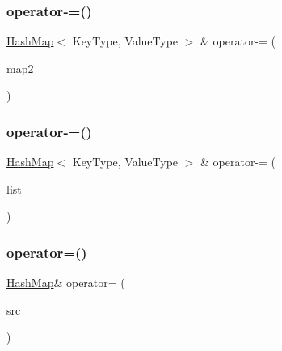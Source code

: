 \mbox{\label{classHashMap_aa83ed71e72154b05ef8383a1edf82a92}} 
\subsubsection{\texorpdfstring{operator-\/=()}{operator-=()}\hspace{0.1cm}{\footnotesize\ttfamily [1/2]}}
{\footnotesize\ttfamily \mbox{\hyperlink{classHashMap}{Hash\+Map}}$<$ Key\+Type, Value\+Type $>$ \& operator-\/= (\begin{DoxyParamCaption}\item[{const \mbox{\hyperlink{classHashMap}{Hash\+Map}}$<$ Key\+Type, Value\+Type $>$ \&}]{map2 }\end{DoxyParamCaption})}

\mbox{\label{classHashMap_ab0fc9969c9d5ebeada5561b18fa2b3eb}} 
\subsubsection{\texorpdfstring{operator-\/=()}{operator-=()}\hspace{0.1cm}{\footnotesize\ttfamily [2/2]}}
{\footnotesize\ttfamily \mbox{\hyperlink{classHashMap}{Hash\+Map}}$<$ Key\+Type, Value\+Type $>$ \& operator-\/= (\begin{DoxyParamCaption}\item[{std\+::initializer\+\_\+list$<$ std\+::pair$<$ Key\+Type, Value\+Type $>$ $>$}]{list }\end{DoxyParamCaption})}

\mbox{\label{classHashMap_a5dc2970a57b73484140e087d338095ec}} 
\subsubsection{\texorpdfstring{operator=()}{operator=()}}
{\footnotesize\ttfamily \mbox{\hyperlink{classHashMap}{Hash\+Map}}\& operator= (\begin{DoxyParamCaption}\item[{const \mbox{\hyperlink{classHashMap}{Hash\+Map}}$<$ Key\+Type, Value\+Type $>$ \&}]{src }\end{DoxyParamCaption})\hspace{0.3cm}{\ttfamily [inline]}}

